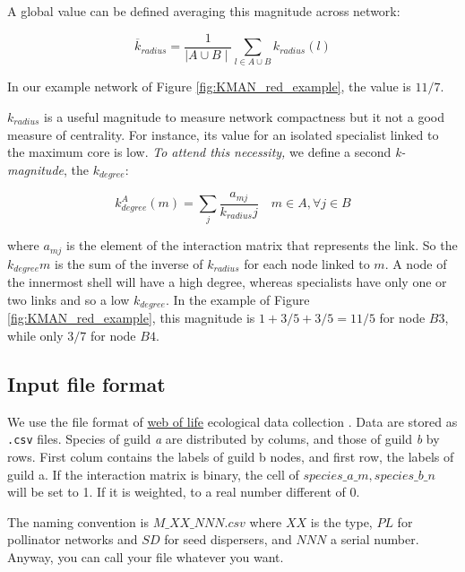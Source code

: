 \documentclass[11pt]{article}
\begin{document}
A global value can be defined averaging this magnitude across network:

\begin{equation}
\displaystyle
\overline {k}_{radius} = \frac{1}{\mid A \cup B \mid}\sum\limits_{l \in A \cup B} k_{radius}(l)
\label{avgkradius}
\end{equation}

In our example network of Figure \ref{fig:KMAN_red_example}, the value is $11/7$. 

${k}_{radius}$ is a useful magnitude to measure network compactness but it not a good measure of centrality. For instance, its value for an isolated specialist linked to the maximum core is low. \emph{To attend this necessity,} we define a second \textit{k-magnitude}, the ${k}_{degree}$:

\begin{equation}
\displaystyle
k^A_{degree}(m) = \sum\limits_{j} \frac{a_{mj} }{k_{radius}j}  \quad   m \in A, \forall j \in B
\label{kdegree}
\end{equation}

\noindent where $a_{mj}$ is the element of the interaction matrix that represents the link. So the $k_{degree}m$ is the sum of the inverse of $k_{radius}$ for each node linked to $m$. A node of the innermost shell will have a high degree, whereas specialists have only one or two links and so a low $k_{degree}$. In the example of Figure \ref{fig:KMAN_red_example}, this magnitude is $1+3/5+3/5 = 11/5$ for node $B3$, while only $3/7$ for node $B4$. 

\subsection*{Input file format}
\label{input_file_format}

We use the file format of \href{http://www.web-of-life.es/}{web of life} ecological data collection \cite{bascompte2009}. Data are stored as \texttt{.csv} files. Species of guild \textit{a} are distributed by colums, and those of guild \textit{b} by rows. First colum contains the labels of guild b nodes, and first row, the labels of guild a. If the interaction matrix is binary, the cell of $species\_a\_m,species\_b\_n$ will be set to 1. If it is weighted, to a real number different of 0.

The naming convention is $M\_XX\_NNN.csv$ where $XX$ is the type, $PL$ for pollinator networks and $SD$ for seed dispersers, and $NNN$ a serial number. Anyway, you can call your file whatever you want.
\end{document}
